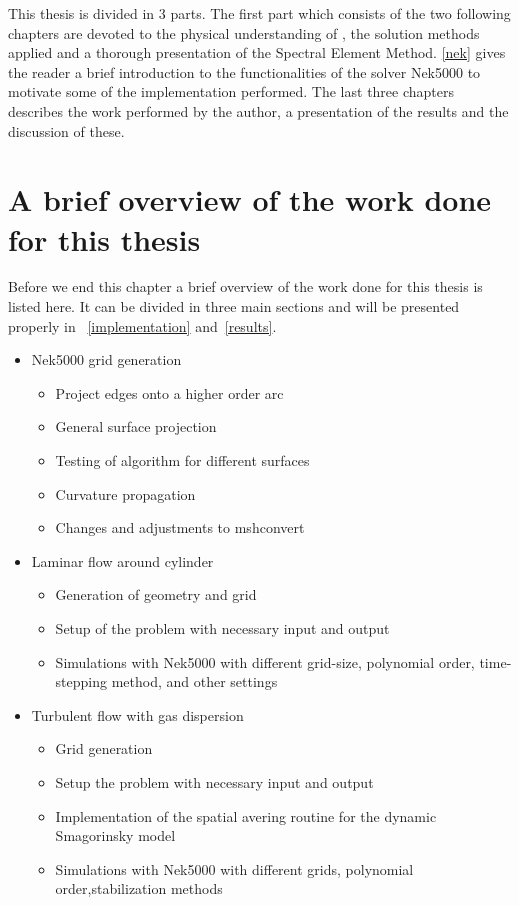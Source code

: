 This thesis is divided in 3 parts. The first part which consists of the two following chapters are devoted to the physical understanding 
of , the solution methods applied and a thorough presentation of the Spectral Element Method. \cref{nek} gives the reader a brief 
introduction to the functionalities of the solver Nek5000 to motivate some of the implementation performed. The last three chapters 
describes the work performed by the author, a presentation of the results and the discussion of these.

\section{A brief overview of the work done for this thesis}

Before we end this chapter a brief overview of the work done for this thesis is listed here. 
It can be divided in three main sections and will be presented properly in
~\cref{implementation} and~\ref{results}. 

\begin{itemize}
    \item Nek5000 grid generation
        \begin{itemize}
            \item Project edges onto a higher order arc
            \item General surface projection
            \item Testing of algorithm for different surfaces
            \item Curvature propagation
            \item Changes and adjustments to mshconvert
        \end{itemize}
    \item Laminar flow around cylinder
        \begin{itemize}
            \item Generation of geometry and grid
            \item Setup of the problem with necessary input and output
            \item Simulations with Nek5000 with different grid-size, polynomial order, time-stepping method, and other settings
        \end{itemize}
    \item Turbulent flow with gas dispersion
        \begin{itemize}
            \item Grid generation
            \item Setup the problem with necessary input and output
            \item Implementation of the spatial avering routine for the dynamic Smagorinsky model
            \item Simulations with Nek5000 with different grids, polynomial order,stabilization methods
        \end{itemize}
\end{itemize}

